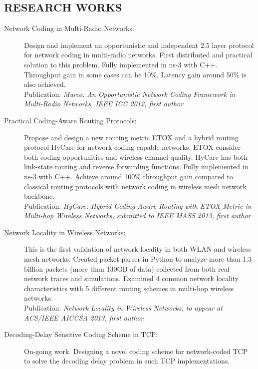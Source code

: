 \documentclass[line]{res}
\begin{document}
\begin{resume}
	\section{RESEARCH WORKS}
	\begin{description}
		\item[Network Coding in Multi-Radio Networks:]
			Design and implement an opportunistic and independent 2.5 layer protocol for network coding in multi-radio networks. First distributed and practical solution to this problem. Fully implemented in ns-3 with C++. Throughput gain in some cases can be 10\%. Latency gain around 50\% is also achieved. \\
			Publication: \emph{Murco: An Opportunistic Network Coding Framework in Multi-Radio Networks, IEEE ICC 2012, first author}
		\item[Practical Coding-Aware Routing Protocols:]
			Propose and design a new routing metric ETOX and a hybrid routing protocol HyCare for network coding capable networks. ETOX consider both coding opportunities and wireless channel quality. HyCare has both link-state routing and reverse forwarding functions. Fully implemented in ns-3 with C++. Achieve around 100\% throughput gain compared to classical routing protocols with network coding in wireless mesh network backbone.\\
			Publication: \emph{HyCare: Hybrid Coding-Aware Routing with ETOX Metric in Multi-hop Wireless Networks, submitted to IEEE MASS 2013, first author}
		\item[Network Locality in Wireless Networks:]
			This is the first validation of network locality in both WLAN and wireless mesh networks. Created packet parser in Python to analyze more than 1.3 billion packets (more than 130GB of data) collected from both real network traces and simulations. Examined 4 common network locality characteristics with 5 different routing schemes in multi-hop wireless networks.\\
			Publication: \emph{Network Locality in Wireless Networks, to appear at ACS/IEEE AICCSA 2013, first author}
		\item [Decoding-Delay Sensitive Coding Scheme in TCP:]
			On-going work. Designing a novel coding scheme for network-coded TCP to solve the decoding delay problem in such TCP implementations.
	\end{description}
	

\end{resume}
\end{document}
